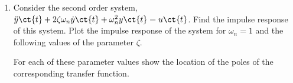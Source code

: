 \begin{enumerate}[resume]
    \item Consider the second order system, $\ddot{y}\ct{t} + 2\zeta\omega_n\dot{y}\ct{t} + \omega_n^2y\ct{t} = u\ct{t}$. Find the impulse response of this system. Plot the impulse response of the system for $\omega_n = 1$ and the following values of the parameter $\zeta$.
    For each of these parameter values show the location of the poles of the corresponding transfer function.
\end{enumerate}
